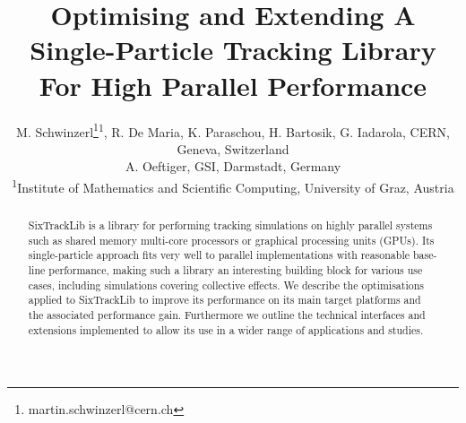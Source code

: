 \documentclass[a4paper,
               refpage,       %
               keeplastbox,   %
               ]{jacow}
\begin{document}
\title{Optimising and Extending A Single-Particle Tracking Library For High Parallel Performance}

\author{M. Schwinzerl\thanks{martin.schwinzerl@cern.ch}\textsuperscript{1}, R. De Maria, K. Paraschou, H. Bartosik, G. Iadarola, CERN, Geneva, Switzerland\\
		A. Oeftiger, GSI, Darmstadt, Germany\\
		\textsuperscript{1}Institute of Mathematics and Scientific Computing, University of Graz, Austria}
	
\maketitle

%
\begin{abstract}
   SixTrackLib is a library for performing tracking simulations on highly parallel systems such as shared memory multi-core processors or graphical processing units (GPUs). Its single-particle approach fits very well to parallel implementations with reasonable base-line performance, making such a library an interesting building block for various use cases, including simulations covering collective effects. We describe the optimisations applied to SixTrackLib to improve its performance on its main target platforms and the associated performance gain. Furthermore we outline the technical interfaces and extensions implemented to allow its use in a wider range of applications and studies.
\end{abstract}
\end{document}
